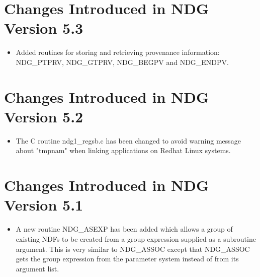 \newpage
{}

\newpage
\section{Changes Introduced in NDG Version 5.3}
\begin{itemize}
   \item Added routines for storing and retrieving provenance information:
         NDG\_PTPRV, NDG\_GTPRV, NDG\_BEGPV and NDG\_ENDPV.
\end{itemize}

\section{Changes Introduced in NDG Version 5.2}
\begin{itemize}
   \item The C routine ndg1\_regsb.c has been changed to avoid warning 
         message about "tmpnam" when linking applications on Redhat Linux 
	 systems.
\end{itemize}

\section{Changes Introduced in NDG Version 5.1}
\begin{itemize}
   \item A new routine NDG\_ASEXP has been added which allows a group of
         existing NDFs to be created from a group expression supplied as 
         a subroutine argument. This is very similar to NDG\_ASSOC except
         that NDG\_ASSOC gets the group expression from the parameter system
         instead of from its argument list.
\end{itemize}


